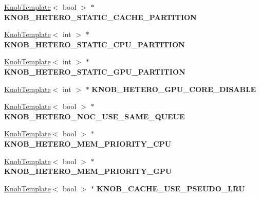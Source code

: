 \begin{DoxyCompactItemize}
\item 
\hypertarget{classall__knobs__c_a2e3e3cf5cbda9be3577ec5b3b9f5e3bc}{
\hyperlink{classKnobTemplate}{KnobTemplate}$<$ bool $>$ $\ast$ {\bfseries KNOB\_\-HETERO\_\-STATIC\_\-CACHE\_\-PARTITION}}
\label{classall__knobs__c_a2e3e3cf5cbda9be3577ec5b3b9f5e3bc}

\item 
\hypertarget{classall__knobs__c_adccc62453652986fa6b2cc191948f332}{
\hyperlink{classKnobTemplate}{KnobTemplate}$<$ int $>$ $\ast$ {\bfseries KNOB\_\-HETERO\_\-STATIC\_\-CPU\_\-PARTITION}}
\label{classall__knobs__c_adccc62453652986fa6b2cc191948f332}

\item 
\hypertarget{classall__knobs__c_ad0a22629dfa918bf4df22efe418fa186}{
\hyperlink{classKnobTemplate}{KnobTemplate}$<$ int $>$ $\ast$ {\bfseries KNOB\_\-HETERO\_\-STATIC\_\-GPU\_\-PARTITION}}
\label{classall__knobs__c_ad0a22629dfa918bf4df22efe418fa186}

\item 
\hypertarget{classall__knobs__c_afa7389e92ed0eb25649da6dfdf1e31d2}{
\hyperlink{classKnobTemplate}{KnobTemplate}$<$ int $>$ $\ast$ {\bfseries KNOB\_\-HETERO\_\-GPU\_\-CORE\_\-DISABLE}}
\label{classall__knobs__c_afa7389e92ed0eb25649da6dfdf1e31d2}

\item 
\hypertarget{classall__knobs__c_a9a3b3b35999f6e5252b930649eba8e03}{
\hyperlink{classKnobTemplate}{KnobTemplate}$<$ bool $>$ $\ast$ {\bfseries KNOB\_\-HETERO\_\-NOC\_\-USE\_\-SAME\_\-QUEUE}}
\label{classall__knobs__c_a9a3b3b35999f6e5252b930649eba8e03}

\item 
\hypertarget{classall__knobs__c_a097d43c36b4685697b5bb89b83a469ab}{
\hyperlink{classKnobTemplate}{KnobTemplate}$<$ bool $>$ $\ast$ {\bfseries KNOB\_\-HETERO\_\-MEM\_\-PRIORITY\_\-CPU}}
\label{classall__knobs__c_a097d43c36b4685697b5bb89b83a469ab}

\item 
\hypertarget{classall__knobs__c_a26bcaee4df5801b88e3eddf543b3cc89}{
\hyperlink{classKnobTemplate}{KnobTemplate}$<$ bool $>$ $\ast$ {\bfseries KNOB\_\-HETERO\_\-MEM\_\-PRIORITY\_\-GPU}}
\label{classall__knobs__c_a26bcaee4df5801b88e3eddf543b3cc89}

\item 
\hypertarget{classall__knobs__c_a27c0acbde4d4c79b7219b4c65d7adf3e}{
\hyperlink{classKnobTemplate}{KnobTemplate}$<$ bool $>$ $\ast$ {\bfseries KNOB\_\-CACHE\_\-USE\_\-PSEUDO\_\-LRU}}
\label{classall__knobs__c_a27c0acbde4d4c79b7219b4c65d7adf3e}


\end{DoxyCompactItemize}

